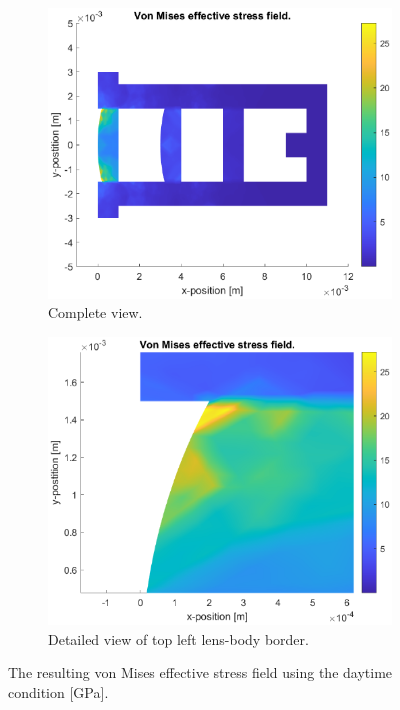 \documentclass[a4paper,11pt]{article}
\begin{document}
\begin{figure}[H]
    \centering
    \begin{subfigure}{0.45\linewidth}{
        \centering
        \includegraphics[width=1\linewidth]{cDay.eps}
        \caption{Complete view.}
        \label{sub:cday}
    }\end{subfigure}
    \begin{subfigure}{0.45\linewidth}{
        \centering
        \includegraphics[width=1\linewidth]{cDayDetail.eps}
        \caption{Detailed view of top left lens-body border.}
        \label{sub:cday_detail}
    }\end{subfigure}
    \caption{The resulting von Mises effective stress field using the daytime condition [GPa].}
    \label{fig:cday}
\end{figure}
\end{document}
